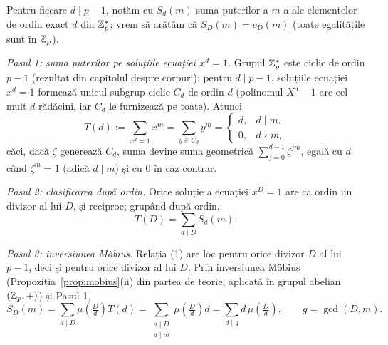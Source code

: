 \begin{solutie}
Pentru fiecare $d \mid p-1$, notăm cu $S_d(m)$ suma puterilor a $m$-a ale elementelor de ordin exact $d$ din $\mathbb{Z}_p^*$; vrem să arătăm că $S_D(m) = c_D(m)$ (toate egalitățile sunt în $\mathbb{Z}_p$).

\emph{Pasul 1: suma puterilor pe soluțiile ecuației $x^d = 1$.} Grupul $\mathbb{Z}_p^*$ este ciclic de ordin $p-1$ (rezultat din capitolul despre corpuri); pentru $d \mid p-1$, soluțiile ecuației $x^d = 1$ formează unicul subgrup ciclic $C_d$ de ordin $d$ (polinomul $X^d - 1$ are cel mult $d$ rădăcini, iar $C_d$ le furnizează pe toate). Atunci
\[
  T(d) := \sum_{x^d = 1} x^m = \sum_{y \in C_d} y^m =
  \begin{cases}
    d, & d \mid m,\\
    0, & d \nmid m,
  \end{cases}
\]
căci, dacă $\zeta$ generează $C_d$, suma devine suma geometrică $\sum_{j=0}^{d-1} \zeta^{jm}$, egală cu $d$ când $\zeta^m = 1$ (adică $d \mid m$) și cu $0$ în caz contrar.

\emph{Pasul 2: clasificarea după ordin.} Orice soluție a ecuației $x^D = 1$ are ca ordin un divizor al lui $D$, și reciproc; grupând după ordin,
\[
  T(D) = \sum_{d \mid D} S_d(m). \tag{1}
\]

\emph{Pasul 3: inversiunea Möbius.} Relația (1) are loc pentru orice divizor $D$ al lui $p-1$, deci și pentru orice divizor al lui $D$. Prin inversiunea Möbius (Propoziția~\ref{prop:mobius}(ii) din partea de teorie, aplicată în grupul abelian $(\mathbb{Z}_p,+)$) și Pasul 1,
\[
  S_D(m) = \sum_{d \mid D} \mu\!\left(\tfrac{D}{d}\right) T(d)
  = \sum_{\substack{d \mid D\\ d \mid m}} \mu\!\left(\tfrac{D}{d}\right) d
  = \sum_{d \mid g} d\,\mu\!\left(\tfrac{D}{d}\right),
  \qquad g=\gcd(D,m).
\]


\end{solutie}
